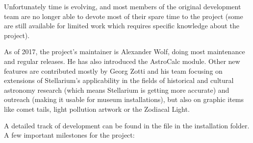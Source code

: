 Unfortunately time is evolving, and most members of the original
development team are no longer able to devote most of their spare time
to the project (some are still available for limited work
which requires specific knowledge about the project).

As of 2017, the project's maintainer is Alexander Wolf, doing most
maintenance and regular releases. He has also introduced the AstroCalc module.
Other new features are contributed
mostly by Georg Zotti and his team focusing on extensions of
Stellarium's applicability in the fields of historical and cultural
astronomy research (which means Stellarium is getting more accurate)
and outreach (making it usable for museum installations), but also on
graphic items like comet tails, light pollution artwork or the Zodiacal Light. 

\vspace{1\baselineskip}
\noindent A detailed track of development can be found in the
 file in the installation folder. A few important
milestones for the project:
